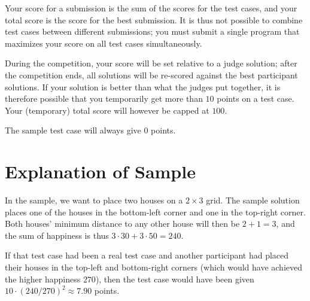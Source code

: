 Your score for a submission is the sum of the scores for the test cases, and your total score is the score for the best submission.
It is thus not possible to combine test cases between different submissions; you must submit a single program that
maximizes your score on all test cases simultaneously.

During the competition, your score will be set relative to a judge solution;
after the competition ends, all solutions will be re-scored against the best participant solutions.
If your solution is better than what the judges put together, it is therefore possible that you temporarily get more than $10$ points on a test case.
Your (temporary) total score will however be capped at $100$.

The sample test case will always give $0$ points.

\section*{Explanation of Sample}
In the sample, we want to place two houses on a $2 \times 3$ grid.
The sample solution places one of the houses in the bottom-left corner and one in the top-right corner.
Both houses' minimum distance to any other house will then be $2 + 1 = 3$,
and the sum of happiness is thus $3 \cdot 30 + 3 \cdot 50 = 240$.

If that test case had been a real test case and another participant had placed their houses
in the top-left and bottom-right corners (which would have achieved the higher happiness $270$), then
the test case would have been given $10 \cdot (240 / 270)^2 \approx 7.90$ points.

